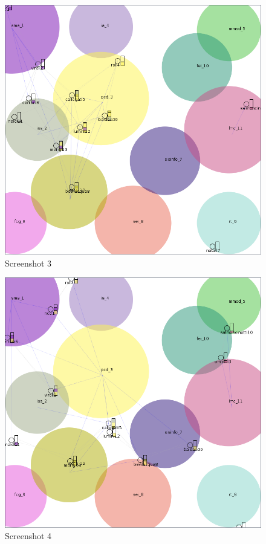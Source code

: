 \begin{figure}[!h]
  \centering
  \includegraphics[width=13cm]{./imgs/screen3.png}
  \caption{Screenshot 3}
  \label{fig:screens3}
\end{figure}

\begin{figure}[!h]
  \centering
  \includegraphics[width=13cm]{./imgs/screen4.png}
  \caption{Screenshot 4}
  \label{fig:screens4}
\end{figure}

\FloatBarrier

